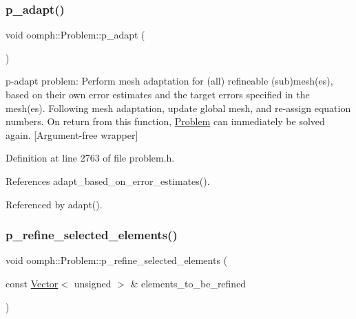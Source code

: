 \mbox{\label{classoomph_1_1Problem_aaad4443f87f3f3affe53fa9160802e7c}} 
\subsubsection{\texorpdfstring{p\+\_\+adapt()}{p\_adapt()}\hspace{0.1cm}{\footnotesize\ttfamily [2/2]}}
{\footnotesize\ttfamily void oomph\+::\+Problem\+::p\+\_\+adapt (\begin{DoxyParamCaption}{ }\end{DoxyParamCaption})\hspace{0.3cm}{\ttfamily [inline]}}



p-\/adapt problem\+: Perform mesh adaptation for (all) refineable (sub)mesh(es), based on their own error estimates and the target errors specified in the mesh(es). Following mesh adaptation, update global mesh, and re-\/assign equation numbers. On return from this function, \hyperlink{classoomph_1_1Problem}{Problem} can immediately be solved again. \mbox{[}Argument-\/free wrapper\mbox{]} 



Definition at line 2763 of file problem.\+h.



References adapt\+\_\+based\+\_\+on\+\_\+error\+\_\+estimates().



Referenced by adapt().

\mbox{\label{classoomph_1_1Problem_a2042cdd88af58eedc66bfaf29b370ff1}} 
\subsubsection{\texorpdfstring{p\+\_\+refine\+\_\+selected\+\_\+elements()}{p\_refine\_selected\_elements()}\hspace{0.1cm}{\footnotesize\ttfamily [1/6]}}
{\footnotesize\ttfamily void oomph\+::\+Problem\+::p\+\_\+refine\+\_\+selected\+\_\+elements (\begin{DoxyParamCaption}\item[{const \hyperlink{classoomph_1_1Vector}{Vector}$<$ unsigned $>$ \&}]{elements\+\_\+to\+\_\+be\+\_\+refined }\end{DoxyParamCaption})}



